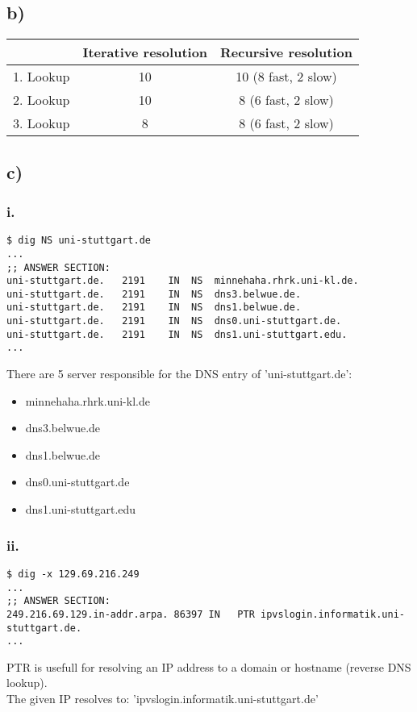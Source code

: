 \documentclass{scrartcl}
\begin{document}
\subsection*{b)}
\begin{center}
	\begin{tabular}{|c|c|c|}
		\hline
		& Iterative resolution & Recursive resolution \\ \hline
		1. Lookup & 10 & 10 (8 fast, 2 slow) \\ \hline
		2. Lookup & 10 & 8 (6 fast, 2 slow) \\ \hline
		3. Lookup & 8 & 8 (6 fast, 2 slow) \\ \hline
	\end{tabular}
\end{center}

\subsection*{c)}

\lstset{basicstyle=\ttfamily\footnotesize,breaklines=true}
\subsubsection*{i.}
\begin{lstlisting}
$ dig NS uni-stuttgart.de
...
;; ANSWER SECTION:
uni-stuttgart.de.	2191	IN	NS	minnehaha.rhrk.uni-kl.de.
uni-stuttgart.de.	2191	IN	NS	dns3.belwue.de.
uni-stuttgart.de.	2191	IN	NS	dns1.belwue.de.
uni-stuttgart.de.	2191	IN	NS	dns0.uni-stuttgart.de.
uni-stuttgart.de.	2191	IN	NS	dns1.uni-stuttgart.edu.
...
\end{lstlisting}
There are 5 server responsible for the DNS entry of 'uni-stuttgart.de':
\begin{itemize}
	\item minnehaha.rhrk.uni-kl.de
	\item dns3.belwue.de
	\item dns1.belwue.de
	\item dns0.uni-stuttgart.de
	\item dns1.uni-stuttgart.edu
\end{itemize}
\subsubsection*{ii.}
\begin{lstlisting}
$ dig -x 129.69.216.249
...
;; ANSWER SECTION:
249.216.69.129.in-addr.arpa. 86397 IN	PTR	ipvslogin.informatik.uni-stuttgart.de.
...
\end{lstlisting}
PTR is usefull for resolving an IP address to a domain or hostname (reverse DNS lookup).\\
The given IP resolves to: 'ipvslogin.informatik.uni-stuttgart.de'
\end{document}
